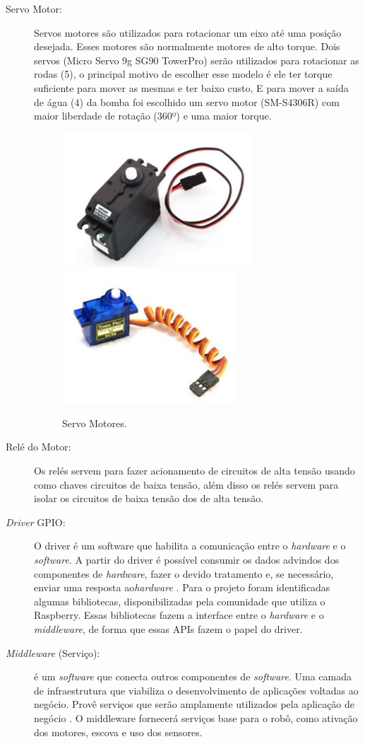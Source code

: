 \begin{description}
\item[Servo Motor:] Servos motores são utilizados para rotacionar um eixo até
uma posição desejada. Esses motores são normalmente motores de alto torque.
Dois servos (Micro Servo 9g SG90 TowerPro) serão utilizados para rotacionar
as rodas (5), o principal motivo de escolher esse modelo é ele ter torque
suficiente para mover as mesmas e ter baixo custo, E para mover a saída de água
(4) da bomba foi escolhido um servo motor (SM-S4306R) com maior liberdade de
rotação (360º) e uma maior torque.
\begin{figure}[h]
  \centering
	\includegraphics[height=5cm]{figures/servant-motor.png}
	\quad
	\includegraphics[height=5cm]{figures/micro-motor.png}
  \caption{Servo Motores.}
\end{figure}
\FloatBarrier

\item[Relé do Motor:] Os relés servem para fazer acionamento de circuitos
de alta tensão usando como chaves circuitos de baixa tensão, além disso os
 relés servem para isolar os circuitos de baixa tensão dos de alta tensão.
 
\item[\textit{Driver} GPIO:] O driver é um software que habilita a comunicação
entre o \textit{hardware} e o \textit{software}. A partir do driver é possível consumir os
dados advindos dos componentes de \textit{hardware}, fazer o devido tratamento e, se
necessário, enviar uma resposta ao\textit{hardware} \cite{windows2016}. Para o projeto foram
identificadas algumas bibliotecas, disponibilizadas pela comunidade que utiliza
o Raspberry. Essas bibliotecas fazem a interface entre o \textit{hardware} e o
\textit{middleware}, de forma que essas APIs fazem o papel do driver.

\item[\textit{Middleware} (Serviço):] é um \textit{software} que conecta outros componentes
de \textit{software}. Uma camada de infraestrutura que viabiliza o desenvolvimento de
aplicações voltadas ao negócio. Provê serviços que serão amplamente utilizados
pela aplicação de negócio \cite{oracle2016}. O middleware fornecerá serviços base para
o robô, como ativação dos motores, escova e uso dos sensores.
\end{description}

